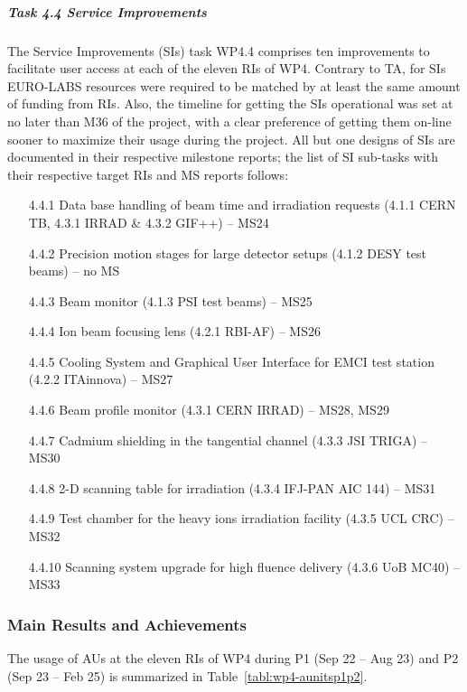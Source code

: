 \subparagraph{Task 4.4 Service Improvements} \mbox{}

The Service Improvements (SIs) task WP4.4 comprises ten improvements to facilitate user access at each of the eleven RIs of WP4. Contrary to TA, for SIs EURO-LABS resources were required to be matched by at least the same amount of funding from RIs. Also, the timeline for getting the SIs operational was set at no later than M36 of the project, with a clear preference of getting them on-line sooner to maximize their usage during the project. All but one designs of SIs are documented in their respective milestone reports; the list of SI sub-tasks with their respective target RIs and MS reports follows:
\begin{itemize}
    \item
[4.4.1]	Data base handling of beam time and irradiation requests (4.1.1 CERN TB, 4.3.1 IRRAD \& 4.3.2 GIF++) – MS24
    \item
[4.4.2]	Precision motion stages for large detector setups (4.1.2 DESY test beams) – no MS
    \item
[4.4.3]	Beam monitor (4.1.3 PSI test beams) – MS25
    \item
[4.4.4]	Ion beam focusing lens (4.2.1 RBI-AF) – MS26
    \item
[4.4.5]	Cooling System and Graphical User Interface for EMCI test station (4.2.2 ITAinnova) – MS27
    \item
[4.4.6]	Beam profile monitor (4.3.1 CERN IRRAD) – MS28, MS29
    \item
[4.4.7]	Cadmium shielding in the tangential channel (4.3.3 JSI TRIGA) – MS30
    \item
[4.4.8]	2-D scanning table for irradiation (4.3.4 IFJ-PAN AIC 144) – MS31
    \item
[4.4.9]	Test chamber for the heavy ions irradiation facility (4.3.5 UCL CRC) – MS32
    \item
[4.4.10]	Scanning system upgrade for high fluence delivery (4.3.6 UoB MC40) – MS33
\end{itemize}

\subsubsection*{Main Results and Achievements}
The usage of AUs at the eleven RIs of WP4 during P1 (Sep 22 – Aug 23) and P2 (Sep 23 – Feb 25) is summarized in Table~\ref{tabl:wp4-aunitsp1p2}.

